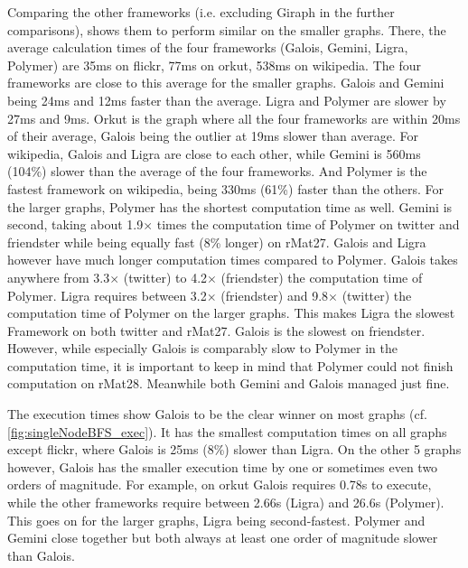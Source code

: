 Comparing the other frameworks (i.e. excluding Giraph in the further comparisons), shows them to perform similar on the smaller graphs. There, the average calculation times of the four frameworks (Galois, Gemini, Ligra, Polymer) are 35ms on flickr, 77ms on orkut, 538ms on wikipedia. 
The four frameworks are close to this average for the smaller graphs. Galois and Gemini being 24ms and 12ms faster than the average. Ligra and Polymer are slower by 27ms and 9ms.
Orkut is the graph where all the four frameworks are within 20ms of their average, Galois being the outlier at 19ms slower than average.
For wikipedia, Galois and Ligra are close to each other, while Gemini is 560ms (104\%) slower than the average of the four frameworks.
And Polymer is the fastest framework on wikipedia, being 330ms (61\%) faster than the others.
For the larger graphs, Polymer has the shortest computation time as well. Gemini is second, taking about 1.9$\times$ times the computation time of Polymer on twitter and friendster while being equally fast (8\% longer) on rMat27. Galois and Ligra however have much longer computation times compared to Polymer. Galois takes anywhere from 3.3$\times$ (twitter) to 4.2$\times$ (friendster) the computation time of Polymer.
Ligra requires between 3.2$\times$ (friendster) and 9.8$\times$ (twitter) the computation time of Polymer on the larger graphs. This makes Ligra the slowest Framework on both twitter and rMat27. Galois is the slowest on friendster.
However, while especially Galois is comparably slow to Polymer in the computation time, it is important to keep in mind that Polymer could not finish computation on rMat28. Meanwhile both Gemini and Galois managed just fine.

The execution times show Galois to be the clear winner on most graphs (cf. \autoref{fig:singleNodeBFS_exec}).
It has the smallest computation times on all graphs except flickr, where Galois is 25ms (8\%) slower than Ligra. 
On the other 5 graphs however, Galois has the smaller execution time by one or sometimes even two orders of magnitude. 
For example, on orkut Galois requires 0.78s to execute, while the other frameworks require between 2.66s (Ligra) and 26.6s (Polymer).
This goes on for the larger graphs, Ligra being second-fastest. Polymer and Gemini close together but both always at least one order of magnitude slower than Galois.

